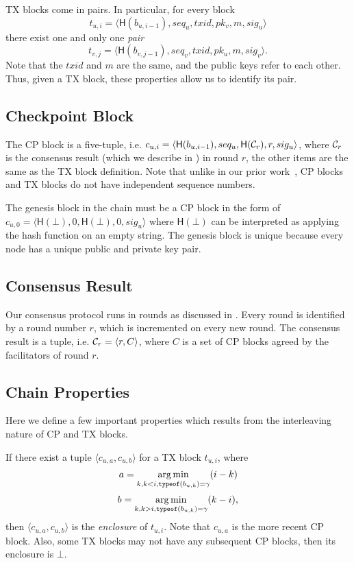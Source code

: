TX blocks come in pairs.
In particular, for every block 
$$t_{u, i} = \langle \textsf{H}(b_{u, i - 1}), seq_u, txid, pk_v, m, sig_u \rangle$$
there exist one and only one \emph{pair} 
$$t_{v, j} = \langle \textsf{H}(b_{v, j - 1}), seq_v, txid, pk_u, m, sig_v \rangle.$$
Note that the $txid$ and $m$ are the same, and the public keys refer to each other.
Thus, given a TX block, these properties allow us to identify its pair.


\subsection{Checkpoint Block}

The CP block is a five-tuple, 
i.e. $c_{u, i} = \langle \textsf{H}(b_{u, i-1}), seq_u, \textsf{H}(\mathcal{C}_r), r, sig_u \rangle$,
where $\mathcal{C}_r$ is the consensus result (which we describe in ) in round $r$, the other items are the same as the TX block definition.
Note that unlike in our prior work~\cite{implicitconsensus}, CP blocks and TX blocks do not have independent sequence numbers.

The genesis block in the chain must be a CP block in the form of
$c_{u, 0} = \langle \textsf{H}(\bot), 0,  \textsf{H}(\bot), 0, sig_u \rangle$
where $\textsf{H}(\bot)$ can be interpreted as applying the hash function on an empty string.
The genesis block is unique because every node has a unique public and private key pair.


\subsection{Consensus Result}
\label{sec:consensus-result}
Our consensus protocol runs in rounds as discussed in .
Every round is identified by a round number $r$, which is incremented on every new round.
The consensus result is a tuple, i.e. $\mathcal{C}_r = \langle r, C \rangle$,
where $C$ is a set of CP blocks agreed by the facilitators of round $r$.

\subsection{Chain Properties}
Here we define a few important properties which results from the interleaving nature of CP and TX blocks.

If there exist a tuple $\langle c_{u,a}, c_{u, b} \rangle$ for a TX block $t_{u, i}$,
where 
$$a = \operatorname*{arg\,min}_{k, k < i, \texttt{typeof}(b_{u,k}) = \gamma}(i - k)$$
$$b = \operatorname*{arg\,min}_{k, k > i, \texttt{typeof}(b_{u,k}) = \gamma}(k - i),$$
then $\langle c_{u,a}, c_{u, b} \rangle$ is the \emph{enclosure} of $t_{u, i}$.
Note that $c_{u, a}$ is the more recent CP block.
Also, some TX blocks may not have any subsequent CP blocks, then its enclosure is $\bot$.

